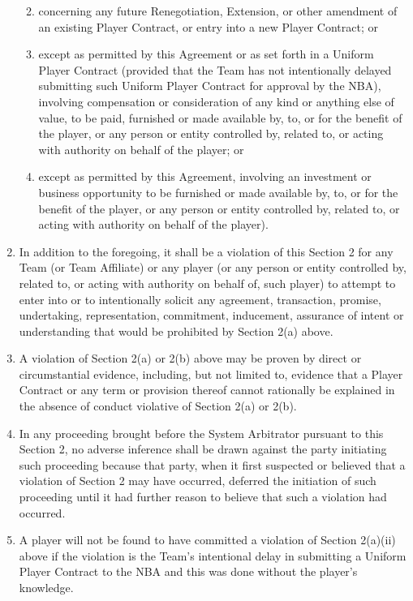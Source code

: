 \documentclass[
]{book}
\providecommand{\tightlist}{%
  \setlength{\itemsep}{0pt}\setlength{\parskip}{0pt}}
\begin{document}
\begin{enumerate}
  \begin{enumerate}
  \def\labelenumii{(\roman{enumii})}
  \tightlist
  \item
    concerning any future Renegotiation, Extension, or other amendment of an existing Player Contract, or entry into a new Player Contract; or
  \item
    except as permitted by this Agreement or as set forth in a Uniform Player Contract (provided that the Team has not intentionally delayed submitting such Uniform Player Contract for approval by the NBA), involving compensation or consideration of any kind or anything else of value, to be paid, furnished or made available by, to, or for the benefit of the player, or any person or entity controlled by, related to, or acting with authority on behalf of the player; or
  \item
    except as permitted by this Agreement, involving an investment or business opportunity to be furnished or made available by, to, or for the benefit of the player, or any person or entity controlled by, related to, or acting with authority on behalf of the player).
  \end{enumerate}
\item
  In addition to the foregoing, it shall be a violation of this Section 2 for any Team (or Team Affiliate) or any player (or any person or entity controlled by, related to, or acting with authority on behalf of, such player) to attempt to enter into or to intentionally solicit any agreement, transaction, promise, undertaking, representation, commitment, inducement, assurance of intent or understanding that would be prohibited by Section 2(a) above.
\item
  A violation of Section 2(a) or 2(b) above may be proven by direct or circumstantial evidence, including, but not limited to, evidence that a Player Contract or any term or provision thereof cannot rationally be explained in the absence of conduct violative of Section 2(a) or 2(b).
\item
  In any proceeding brought before the System Arbitrator pursuant to this Section 2, no adverse inference shall be drawn against the party initiating such proceeding because that party, when it first suspected or believed that a violation of Section 2 may have occurred, deferred the initiation of such proceeding until it had further reason to believe that such a violation had occurred.
\item
  A player will not be found to have committed a violation of Section 2(a)(ii) above if the violation is the Team's intentional delay in submitting a Uniform Player Contract to the NBA and this was done without the player's knowledge.
\end{enumerate}
\end{document}
